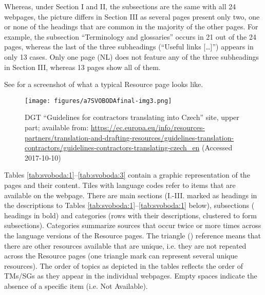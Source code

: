\documentclass[output=paper]{langsci/langscibook}
\begin{document}
Whereas, under Section I and II, the subsections are the same with all 24 webpages, the picture differs in Section III as several pages present only two, one or none of the headings that are common in the majority of the other pages. For example, the subsection “Terminology and glossaries” occurs in 21 out of the 24 pages, whereas the last of the three subheadings (“Useful links […]”) appears in only 13 cases. Only one page (NL) does not feature any of the three subheadings in Section III, whereas 13 pages show all of them.

See  for a screenshot of what a typical Resource page looks like.

\begin{figure}
\caption{DGT “Guidelines for contractors translating into Czech” site, upper part; available from: \url{https://ec.europa.eu/info/resources-partners/translation-and-drafting-resources/guidelines-translation-contractors/guidelines-contractors-translating-czech_en} (Accessed 2017-10-10)}
\label{fig:svoboda:3}
\texttt{[image: figures/a7SVOBODAfinal-img3.png]}
\end{figure}

 
Tables \ref{tab:svoboda:1}--\ref{tab:svoboda:3} contain a graphic representation of the pages and their content. Tiles with language codes refer to items that are available on the webpage. There are main sections (I.-III. marked as headings in the descriptions to Tables \ref{tab:svoboda:1}--\ref{tab:svoboda:1} below), subsections ( headings in bold) and categories (rows with their descriptions, clustered to form subsections). Categories summarize sources that occur twice or more times across the language versions of the Resource pages. 
The triangle ({\▴}) reference means that there are other resources available that are unique, i.e. they are not repeated across the Resource pages (one triangle mark can represent several unique resources). The order of topics as depicted in the tables reflects the order of TMs/SGs as they appear in the individual webpages.
Empty spaces indicate the absence of a specific item (i.e. Not Available). 
\end{document}
